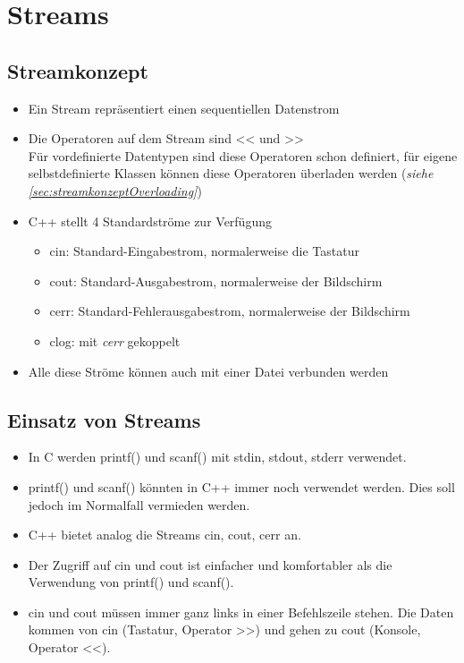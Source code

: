 \section{Streams}

\subsection{Streamkonzept}
\label{sec:streamkonzept}
\begin{itemize}
	\item Ein Stream repräsentiert einen sequentiellen Datenstrom
	\item Die Operatoren auf dem Stream sind << und >>\\
	Für vordefinierte Datentypen sind diese Operatoren schon definiert, für eigene selbstdefinierte Klassen können diese Operatoren überladen werden (\emph{siehe \ref{sec:streamkonzeptOverloading}})
	\item C++ stellt 4 Standardströme zur Verfügung
	\begin{itemize}
		\item cin:	Standard-Eingabestrom, normalerweise die Tastatur
		\item cout:	Standard-Ausgabestrom, normalerweise der Bildschirm
		\item cerr:	Standard-Fehlerausgabestrom, normalerweise der Bildschirm
		\item clog: mit \emph{cerr} gekoppelt
	\end{itemize}
	\item Alle diese Ströme können auch mit einer Datei verbunden werden
\end{itemize}

\subsection{Einsatz von Streams}
\begin{itemize}
	\item In C werden printf() und scanf() mit stdin, stdout, stderr verwendet.
	\item printf() und scanf() könnten in C++ immer noch verwendet werden. Dies soll jedoch im Normalfall vermieden werden.
	\item C++ bietet analog die Streams cin, cout, cerr an.
	\item Der Zugriff auf cin und cout ist einfacher und komfortabler als die Verwendung von printf() und scanf().
	\item cin und cout müssen immer ganz links in einer Befehlszeile stehen. Die Daten kommen von cin (Tastatur, Operator >>) und gehen zu cout (Konsole, Operator <<).
\end{itemize}

